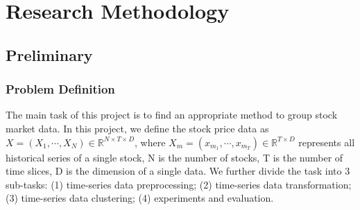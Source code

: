 \chapter{Research Methodology}
\label{ch:Methodology}

\section{Preliminary}
\subsection{Problem Definition}

The main task of this project is to find an appropriate method to group stock market data. In this project, we define the stock price data as $X = (X_1, \cdots, X_N) \in \mathbb{R}^{N \times T \times D} $, where $X_m = (x_{m_1},\cdots, x_{m_T}) \in \mathbb{R}^{T \times D} $ represents all historical series of a single stock, N is the number of stocks, T is the number of time slices, D is the dimension of a single data.  We further divide the task into 3 sub-tasks: (1) time-series data preprocessing; (2) time-series data transformation; (3) time-series data clustering; (4) experiments and evaluation.

